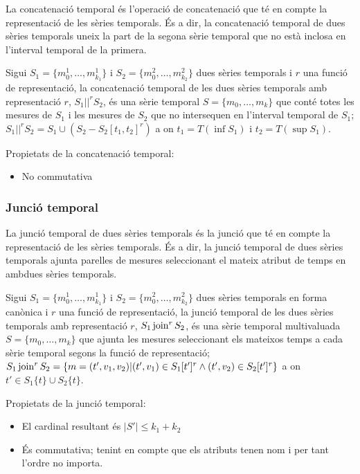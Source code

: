 La concatenació temporal és l'operació de concatenació que té en
compte la representació de les sèries temporals.  És a dir, la
concatenació temporal de dues sèries temporals uneix la part de la
segona sèrie temporal que no està inclosa en l'interval temporal de la
primera.


\begin{definition}
  Sigui $S_1=\{m_0^1, \dotsc, m_{k_1}^1\}$ i $S_2=\{m_0^2, \dotsc,
  m_{k_2}^2\}$ dues sèries temporals i $r$ una funció de
  representació, la concatenació temporal de les dues sèries temporals
  amb representació $r$, $S_1 ||^r S_2$, és una sèrie temporal $S=\{m_0,
  \dotsc, m_k\}$ que conté totes les mesures de $S_1$ i les mesures de
  $S_2$ que no intersequen en l'interval temporal de $S_1$; $S_1 ||^r
  S_2 = S_1 \cup ( S_2 - S_2[t_1,t_2]^r )$ a on $t_1=T(\inf S_1)$ i
  $t_2=T(\sup S_1)$.
\end{definition}

Propietats de la concatenació temporal:
\begin{itemize}
\item No commutativa
\end{itemize}




\subsubsection{Junció temporal}

La junció temporal de dues sèries temporals és la junció que té en
compte la representació de les sèries temporals. És a dir, la junció
temporal de dues sèries temporals ajunta parelles de mesures
seleccionant el mateix atribut de temps en ambdues sèries temporals.


\begin{definition}\label{def:sgst:joint}
  Sigui $S_1=\{m_0^1, \dotsc, m_{k_1}^1\}$ i $S_2=\{m_0^2, \dotsc,
  m_{k_2}^2\}$ dues sèries temporals en forma canònica i $r$ una
  funció de representació, la junció temporal de les dues sèries
  temporals amb representació $r$, $S_1 \operatorname*{join}^r S_2$, és una sèrie
  temporal multivaluada $S=\{m_0, \dotsc, m_k\}$ que ajunta les
  mesures seleccionant els mateixos temps a cada sèrie temporal segons
  la funció de representació; $S_1 \operatorname*{join}^r S_2 = \{m=(t',v_1,v_2) |
  (t',v_1) \in S_1[t']^r \wedge (t',v_2) \in S_2[t']^r \}$ a on $t'\in
  S_1\{t\} \cup S_2\{t\}$.
\end{definition}


Propietats de la junció temporal:
\begin{itemize}
\item El cardinal resultant és $|S'| \leq k_1 + k_2$
\item És commutativa; tenint en compte que els atributs tenen nom i
  per tant l'ordre no importa.
\end{itemize}



